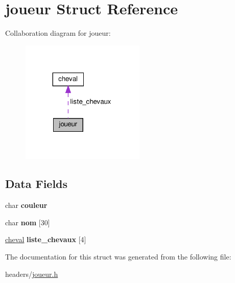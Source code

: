 \hypertarget{structjoueur}{}\section{joueur Struct Reference}
\label{structjoueur}


Collaboration diagram for joueur\+:\nopagebreak
\begin{figure}[H]
\begin{center}
\leavevmode
\includegraphics[width=167pt]{structjoueur__coll__graph}
\end{center}
\end{figure}
\subsection*{Data Fields}
\begin{DoxyCompactItemize}
\item 
\mbox{\label{structjoueur_a7d939a822f708b17b81e028a43f4594e}} 
char {\bfseries couleur}
\item 
\mbox{\label{structjoueur_a65a5f7ac1eb61a6f58ff69be91c4e73b}} 
char {\bfseries nom} \mbox{[}30\mbox{]}
\item 
\mbox{\label{structjoueur_a12e1588bf09d85a0f47a6c513e05ca2c}} 
\mbox{\hyperlink{structcheval}{cheval}} {\bfseries liste\+\_\+chevaux} \mbox{[}4\mbox{]}
\end{DoxyCompactItemize}


The documentation for this struct was generated from the following file\+:\begin{DoxyCompactItemize}
\item 
headers/\mbox{\hyperlink{joueur_8h}{joueur.\+h}}\end{DoxyCompactItemize}
